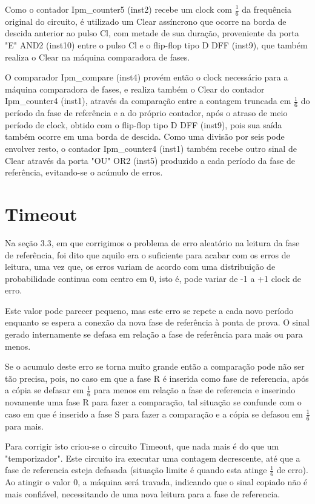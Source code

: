 Como o contador Ipm\_counter5 (inst2) recebe um clock com $\frac{1}{6}$ da
frequência original do circuito, é utilizado um Clear assíncrono que ocorre na borda de descida anterior ao pulso Cl, com metade de sua duração, proveniente da porta "E" AND2 (inst10) entre o pulso Cl e o flip-flop tipo D DFF (inst9), que também realiza o Clear na máquina comparadora de fases.

O comparador Ipm\_compare (inst4) provém então o clock necessário para a
máquina comparadora de fases, e realiza também o Clear do contador Ipm\_counter4 (inst1), através da comparação entre a contagem truncada em $\frac{1}{6}$ do período da fase de referência e a do próprio contador, após o atraso de meio período de clock, obtido com o flip-flop tipo D DFF (inst9), pois sua saída também ocorre em uma borda de descida. Como uma divisão por seis pode envolver resto, o contador Ipm\_counter4 (inst1) também recebe outro sinal de Clear através da porta "OU" OR2 (inst5) produzido a cada período da fase de referência, evitando-se o acúmulo de erros.

\section{Timeout}

Na seção 3.3, em que corrigimos o problema de erro aleatório na leitura da fase de referência, foi dito que aquilo era o suficiente para acabar com os erros de leitura, uma vez que, os erros variam de acordo com uma distribuição de probabilidade continua com centro em 0, isto é, pode variar de -1 a +1 clock de erro.

Este valor pode parecer pequeno, mas este erro se repete a cada novo período enquanto se espera a conexão da nova fase de referência à ponta de prova. O sinal gerado internamente se defasa em relação a fase de referência para mais ou para menos.

Se o acumulo deste erro se torna muito grande então a comparação pode não ser tão precisa, pois, no caso em que a fase R é inserida como fase de referencia, após a cópia se defasar em $\frac{1}{6}$ para menos em relação a fase de referencia e inserindo novamente uma fase R para fazer a comparação, tal situação se confunde com o caso em que é inserido a fase S para fazer a comparação e a cópia se defasou em $\frac{1}{6}$ para mais.

Para corrigir isto criou-se o circuito Timeout, que nada mais é do que um "temporizador". Este circuito ira executar uma contagem decrescente, até que a fase de referencia esteja defasada (situação limite é quando esta atinge $\frac{1}{6}$ de erro). Ao atingir o valor 0, a máquina será travada, indicando que o sinal copiado não é mais confiável, necessitando de uma nova leitura para a fase de referencia.

